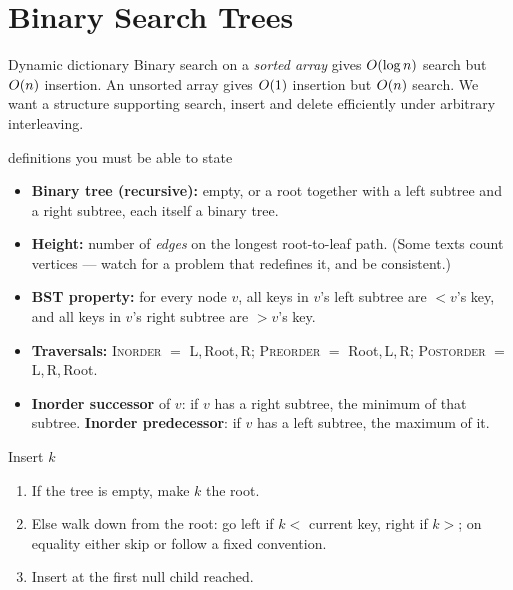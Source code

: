 \section{Binary Search Trees}

\begin{prob}{Dynamic dictionary}
Binary search on a \emph{sorted array} gives $O(\log n)$ search but $O(n)$ insertion. An
unsorted array gives $O(1)$ insertion but $O(n)$ search. We want a structure supporting
search, insert and delete efficiently under arbitrary interleaving.
\end{prob}

\begin{facts}{definitions you must be able to state}
\begin{itemize}
  \item \textbf{Binary tree (recursive):} empty, or a root together with a left subtree and a
        right subtree, each itself a binary tree.
  \item \textbf{Height:} number of \emph{edges} on the longest root-to-leaf path. (Some texts
        count vertices --- watch for a problem that redefines it, and be consistent.)
  \item \textbf{BST property:} for every node $v$, all keys in $v$'s left subtree are $<v$'s key,
        and all keys in $v$'s right subtree are $>v$'s key.
  \item \textbf{Traversals:} \textsc{Inorder} $=$ L,\,Root,\,R; \textsc{Preorder} $=$
        Root,\,L,\,R; \textsc{Postorder} $=$ L,\,R,\,Root.
  \item \textbf{Inorder successor} of $v$: if $v$ has a right subtree, the minimum of that
        subtree. \textbf{Inorder predecessor}: if $v$ has a left subtree, the maximum of it.
\end{itemize}
\end{facts}

\begin{algo}{Insert $k$}
\begin{enumerate}
  \item If the tree is empty, make $k$ the root.
  \item Else walk down from the root: go left if $k<$ current key, right if $k>$; on equality
        either skip or follow a fixed convention.
  \item Insert at the first null child reached.
\end{enumerate}
\end{algo}

